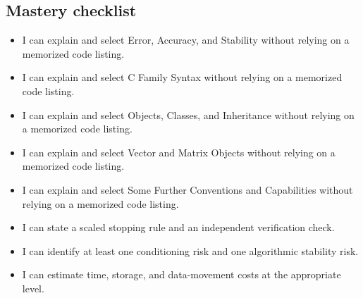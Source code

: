 \documentclass[10pt,letterpaper]{article}
\begin{document}
\subsection*{Mastery checklist}
\begin{itemize}
\item[$\square$] I can explain and select Error, Accuracy, and Stability without relying on a memorized code listing.
\item[$\square$] I can explain and select C Family Syntax without relying on a memorized code listing.
\item[$\square$] I can explain and select Objects, Classes, and Inheritance without relying on a memorized code listing.
\item[$\square$] I can explain and select Vector and Matrix Objects without relying on a memorized code listing.
\item[$\square$] I can explain and select Some Further Conventions and Capabilities without relying on a memorized code listing.
\item[$\square$] I can state a scaled stopping rule and an independent verification check.
\item[$\square$] I can identify at least one conditioning risk and one algorithmic stability risk.
\item[$\square$] I can estimate time, storage, and data-movement costs at the appropriate level.
\end{itemize}
\end{document}
